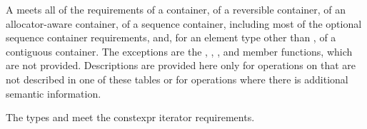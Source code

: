 \pnum
A  meets all of the requirements
of a container,
of a reversible container,
of an allocator-aware container,
of a sequence container, including most of the optional sequence container
requirements,
and, for an element type other than ,
of a contiguous container.
The exceptions are the
, , , and  member functions, which are not
provided. Descriptions are provided here only for operations on 
that are not described in one of these tables or for operations where there is
additional semantic information.

\pnum
The types  and  meet
the constexpr iterator requirements.


